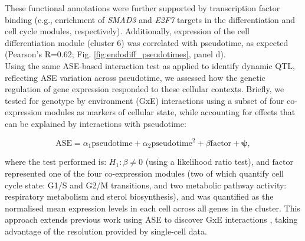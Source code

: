  
These functional annotations were further supported by transcription factor binding (e.g., enrichment of \textit{SMAD3} and \textit{E2F7} targets in the differentiation and cell cycle modules, respectively). 
Additionally, expression of the cell differentiation module (cluster 6) was correlated with pseudotime, as expected (Pearson's R=0.62; Fig. \ref{fig:endodiff_pseudotimes}, panel d).\\

Using the same ASE-based interaction test as applied to identify dynamic QTL, reflecting ASE variation across pseudotime, we assessed how the genetic regulation of gene expression responded to these cellular contexts. 
Briefly, we tested for genotype by environment (GxE) interactions using a subset of four co-expression modules as markers of cellular state, while accounting for effects that can be explained by interactions with pseudotime:


\begin{equation}
    \mathrm{ASE} = \alpha_1 \mathrm{pseudotime} + \alpha_2 \mathrm{pseudotime}^2 + \beta\mathrm{factor} + \boldsymbol{\psi},
\end{equation}

where the test performed is: $H_1: \beta \neq 0$ (using a likelihood ratio test), and $\mathrm{factor}$ represented one of the four co-expression modules (two of which quantify cell cycle state: G1/S and G2/M transitions, and two metabolic pathway activity: respiratory metabolism and sterol biosynthesis), and was quantified as the normalised mean expression levels in each cell across all genes in the cluster.
This approach extends previous work using ASE to discover GxE interactions \cite{knowles2017allele, moyerbrailean2016high}, taking advantage of the resolution provided by single-cell data. \\

